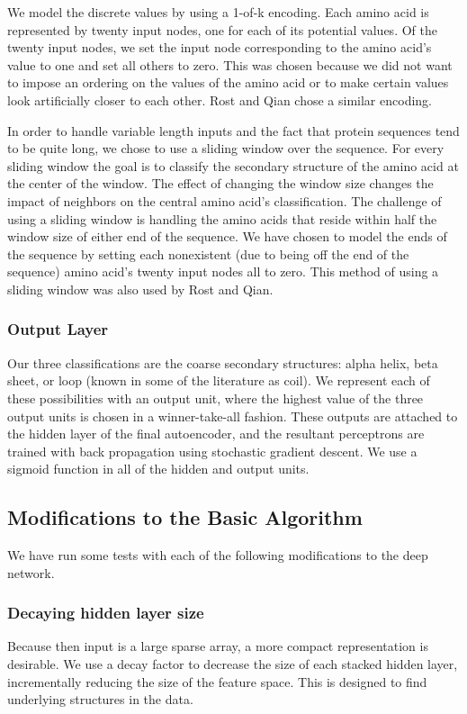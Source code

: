 \documentclass[letterpaper,twocolumn,12pt]{article}
\begin{document}
We model the discrete values by using a 1-of-k encoding.
Each amino acid is represented by twenty input nodes, one for each of its potential values.
Of the twenty input nodes, we set the input node corresponding to the amino acid's value to one and set all others to zero.
This was chosen because we did not want to impose an ordering on the values of the amino acid or to make certain values look artificially closer to each other.
Rost and Qian chose a similar encoding.

In order to handle variable length inputs and the fact that protein sequences tend to be quite long, we chose to use a sliding window over the sequence.
For every sliding window the goal is to classify the secondary structure of the amino acid at the center of the window.
The effect of changing the window size changes the impact of neighbors on the central amino acid's classification.
The challenge of using a sliding window is handling the amino acids that reside within half the window size of either end of the sequence.
We have chosen to model the ends of the sequence by setting each nonexistent (due to being off the end of the sequence) amino acid's twenty input nodes all to zero.
This method of using a sliding window was also used by Rost and Qian.

\subsubsection{Output Layer}
Our three classifications are the coarse secondary structures: alpha helix, beta sheet, or loop (known in some of the literature as coil).
We represent each of these possibilities with an output unit, where the highest value of the three output units is chosen in a winner-take-all fashion.
These outputs are attached to the hidden layer of the final autoencoder, and the resultant perceptrons are trained with back propagation using stochastic gradient descent.
We use a sigmoid function in all of the hidden and output units.

\subsection{Modifications to the Basic Algorithm}
\label{subsec:mods}
We have run some tests with each of the following modifications to the deep network.

\subsubsection{Decaying hidden layer size}
Because then input is a large sparse array, a more compact representation is desirable.
We use a decay factor to decrease the size of each stacked hidden layer, incrementally reducing the size of the feature space.
This is designed to find underlying structures in the data.
\end{document}
